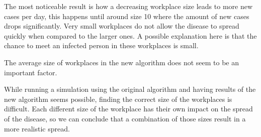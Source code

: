 \documentclass[runningheads]{llncs}
\begin{document}
The most noticeable result is how a decreasing workplace size leads to more new cases per day, this happens until around size 10 where the amount of new cases drops significantly. Very small workplaces do not allow the disease to spread quickly when compared to the larger ones. A possible explanation here is that the chance to meet an infected person in these workplaces is small.

The average size of workplaces in the new algorithm does not seem to be an important factor.

While running a simulation using the original algorithm and having results of the new algorithm seems possible, finding the correct size of the workplaces is difficult. Each different size of the workplace has their own impact on the spread of the disease, so we can conclude that a combination of those sizes result in a more realistic spread.
\end{document}
